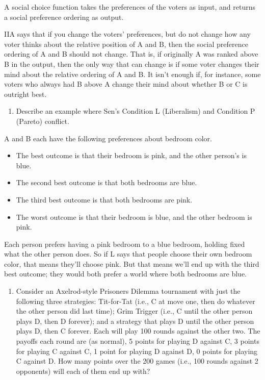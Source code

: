 \documentclass[
  12pt,
  letterpaper,
  DIV=11,
  numbers=noendperiod]{scrartcl}
\providecommand{\tightlist}{%
  \setlength{\itemsep}{0pt}\setlength{\parskip}{0pt}}\usepackage{longtable,booktabs,array}
\begin{document}
A social choice function takes the preferences of the voters as input,
and returns a social preference ordering as output.

IIA says that if you change the voters' preferences, but do not change
how any voter thinks about the relative position of A and B, then the
social preference ordering of A and B should not change. That is, if
originally A was ranked above B in the output, then the only way that
can change is if some voter changes their mind about the relative
ordering of A and B. It isn't enough if, for instance, some voters who
always had B above A change their mind about whether B or C is outright
best.

\begin{enumerate}
\def\labelenumi{\arabic{enumi}.}
\setcounter{enumi}{4}
\tightlist
\item
  Describe an example where Sen's Condition L (Liberalism) and Condition
  P (Pareto) conflict.
\end{enumerate}

A and B each have the following preferences about bedroom color.

\begin{itemize}
\tightlist
\item
  The best outcome is that their bedroom is pink, and the other person's
  is blue.
\item
  The second best outcome is that both bedrooms are blue.
\item
  The third best outcome is that both bedrooms are pink.
\item
  The worst outcome is that their bedroom is blue, and the other bedroom
  is pink.
\end{itemize}

Each person prefers having a pink bedroom to a blue bedroom, holding
fixed what the other person does. So if L says that people choose their
own bedroom color, that means they'll choose pink. But that means we'll
end up with the third best outcome; they would both prefer a world where
both bedrooms are blue.

\begin{enumerate}
\def\labelenumi{\arabic{enumi}.}
\setcounter{enumi}{5}
\tightlist
\item
  Consider an Axelrod-style Prisoners Dilemma tournament with just the
  following three strategies: Tit-for-Tat (i.e., C at move one, then do
  whatever the other person did last time); Grim Trigger (i.e., C until
  the other person plays D, then D forever); and a strategy that plays D
  until the other person plays D, then C forever. Each will play 100
  rounds against the other two. The payoffs each round are (as normal),
  5 points for playing D against C, 3 points for playing C against C, 1
  point for playing D against D, 0 points for playing C against D. How
  many points over the 200 games (i.e., 100 rounds against 2 opponents)
  will each of them end up with?
\end{enumerate}
\end{document}
